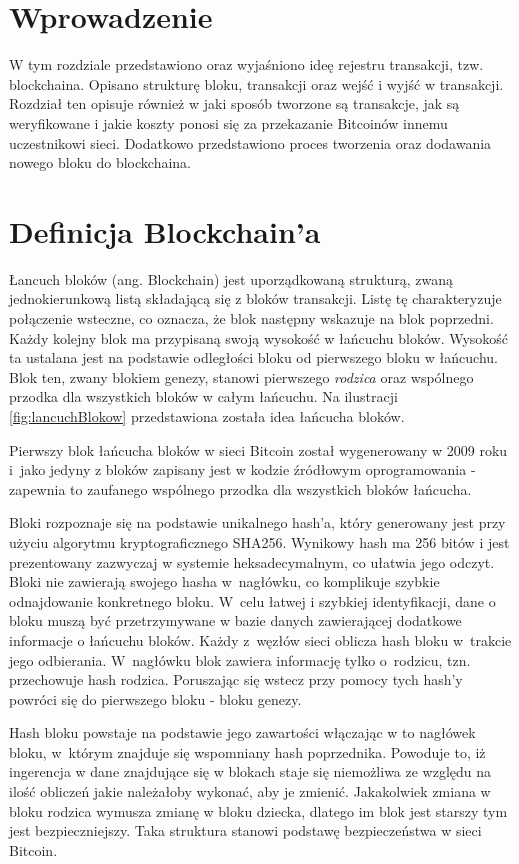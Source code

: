 \documentclass[12pt, twoside, final, openany]{mgr}
\begin{document}
\section{Wprowadzenie}
\indent W tym rozdziale przedstawiono oraz wyjaśniono ideę rejestru transakcji, tzw. blockchaina. Opisano strukturę bloku, transakcji oraz wejść i wyjść w transakcji. Rozdział ten opisuje również w jaki sposób tworzone są transakcje, jak są weryfikowane i jakie koszty ponosi się za przekazanie Bitcoinów innemu uczestnikowi sieci. Dodatkowo przedstawiono proces tworzenia oraz dodawania nowego bloku do blockchaina. 

\section{Definicja Blockchain'a}
\label{definicjaBlockchaina}
\indent Łancuch bloków (ang. Blockchain) jest uporządkowaną strukturą, zwaną jednokierunkową listą składającą się z bloków transakcji. Listę tę charakteryzuje połączenie wsteczne, co oznacza, że blok następny wskazuje na blok poprzedni. Każdy kolejny blok ma przypisaną swoją wysokość w łańcuchu bloków. Wysokość ta ustalana jest na podstawie odległości bloku od pierwszego bloku w łańcuchu. Blok ten, zwany blokiem genezy, stanowi pierwszego \textit{rodzica} oraz wspólnego przodka dla wszystkich bloków w całym łańcuchu\cite{BitcoinAndCryptocurrencyTechnologies}. Na ilustracji \ref{fig:lancuchBlokow} przedstawiona została idea łańcucha bloków.

\indent Pierwszy blok łańcucha bloków w sieci Bitcoin został wygenerowany w 2009 roku i~jako jedyny z bloków zapisany jest w kodzie źródłowym oprogramowania - zapewnia to zaufanego wspólnego przodka dla wszystkich bloków łańcucha.

\indent Bloki rozpoznaje się na podstawie unikalnego hash'a, który generowany jest przy użyciu algorytmu kryptograficznego SHA256. Wynikowy hash ma 256 bitów i jest prezentowany zazwyczaj w systemie heksadecymalnym, co ułatwia jego odczyt. Bloki nie zawierają swojego hasha w~nagłówku, co komplikuje szybkie odnajdowanie konkretnego bloku. W~celu łatwej i szybkiej identyfikacji, dane o bloku muszą być przetrzymywane w bazie danych zawierającej dodatkowe informacje o łańcuchu bloków. Każdy z~węzłów sieci oblicza hash bloku w~trakcie jego odbierania. W~nagłówku blok zawiera informację tylko o~rodzicu, tzn. przechowuje hash rodzica. Poruszając się wstecz przy pomocy tych hash'y powróci się do pierwszego bloku - bloku genezy. 

\indent Hash bloku powstaje na podstawie jego zawartości włączając w to nagłówek bloku, w~którym znajduje się wspomniany hash poprzednika. Powoduje to, iż ingerencja w dane znajdujące się w blokach staje się niemożliwa ze względu na ilość obliczeń jakie należałoby wykonać, aby je zmienić. Jakakolwiek zmiana w bloku rodzica wymusza zmianę w bloku dziecka, dlatego im blok jest starszy tym jest bezpieczniejszy. Taka struktura stanowi podstawę bezpieczeństwa w sieci Bitcoin.
\end{document}
